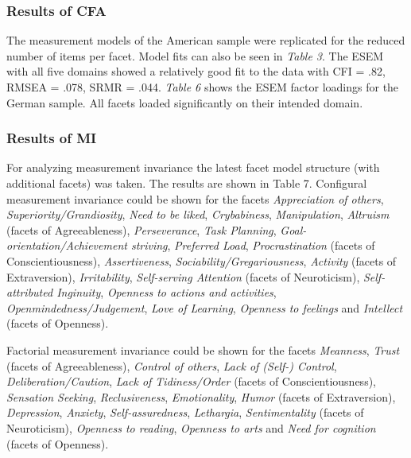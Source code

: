 \documentclass[,man,floatsintext]{apa6}
\begin{document}
\subsubsection{Results of CFA}\label{results-of-cfa}

The measurement models of the American sample were replicated for the
reduced number of items per facet. Model fits can also be seen in
\emph{Table 3}. The ESEM with all five domains showed a relatively good
fit to the data with CFI = .82, RMSEA = .078, SRMR = .044. \emph{Table
6} shows the ESEM factor loadings for the German sample. All facets
loaded significantly on their intended domain.

\vspace{5mm}

\vspace{5mm}

\subsubsection{Results of MI}\label{results-of-mi}

For analyzing measurement invariance the latest facet model structure
(with additional facets) was taken. The results are shown in Table 7.
Configural measurement invariance could be shown for the facets
\emph{Appreciation of others}, \emph{Superiority/Grandiosity},
\emph{Need to be liked}, \emph{Crybabiness}, \emph{Manipulation},
\emph{Altruism} (facets of Agreeableness), \emph{Perseverance},
\emph{Task Planning}, \emph{Goal-orientation/Achievement striving},
\emph{Preferred Load}, \emph{Procrastination} (facets of
Conscientiousness), \emph{Assertiveness},
\emph{Sociability/Gregariousness}, \emph{Activity} (facets of
Extraversion), \emph{Irritability}, \emph{Self-serving Attention}
(facets of Neuroticism), \emph{Self-attributed Inginuity},
\emph{Openness to actions and activities},
\emph{Openmindedness/Judgement}, \emph{Love of Learning}, \emph{Openness
to feelings} and \emph{Intellect} (facets of Openness).

Factorial measurement invariance could be shown for the facets
\emph{Meanness}, \emph{Trust} (facets of Agreeableness), \emph{Control
of others}, \emph{Lack of (Self-) Control}, \emph{Deliberation/Caution},
\emph{Lack of Tidiness/Order} (facets of Conscientiousness),
\emph{Sensation Seeking}, \emph{Reclusiveness}, \emph{Emotionality},
\emph{Humor} (facets of Extraversion), \emph{Depression},
\emph{Anxiety}, \emph{Self-assuredness}, \emph{Lethargia},
\emph{Sentimentality} (facets of Neuroticism), \emph{Openness to
reading}, \emph{Openness to arts} and \emph{Need for cognition} (facets
of Openness).
\end{document}
